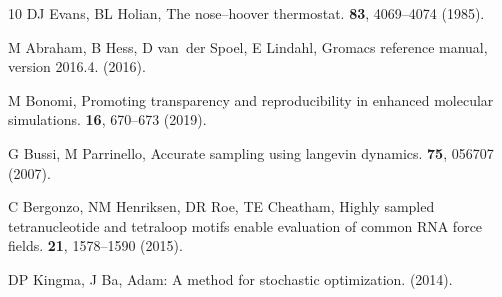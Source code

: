 \documentclass[9pt,twocolumn,twoside]{pnas-new}
\begin{document}
\begin{thebibliography}{10}
DJ Evans, BL Holian, The nose--hoover thermostat.
  \textbf{83}, 4069--4074 (1985).

M Abraham, B Hess, D van~der Spoel, E Lindahl, Gromacs reference manual,
  version 2016.4.
 (2016).

M Bonomi, Promoting transparency and reproducibility in enhanced molecular
  simulations.
 \textbf{16}, 670--673
  (2019).

G Bussi, M Parrinello, Accurate sampling using langevin dynamics.
 \textbf{75}, 056707 (2007).

C Bergonzo, NM Henriksen, DR Roe, TE Cheatham, Highly sampled tetranucleotide
  and tetraloop motifs enable evaluation of common {RNA} force fields.
 \textbf{21}, 1578--1590 (2015).

DP Kingma, J Ba, Adam: A method for stochastic optimization.
 (2014).

\end{thebibliography}
\end{document}
